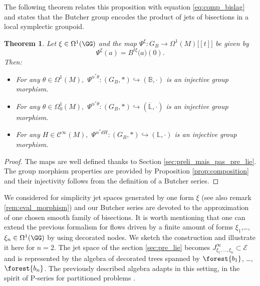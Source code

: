 \documentclass[a4paper,11pt]{article}
\newcommand{\func}[1]{\mathcal{C}^{\infty}(#1)}
\newtheorem{theorem}{Theorem}[section]
\begin{document}
The following theorem relates this proposition with equation \eqref{eq:comp_bislag} and states that the Butcher group encodes the product of jets of bisections in a local symplectic groupoid.
\begin{theorem}\label{thm:somewhat}
Let $\xi \in \Omega^1(\GG)$ and the map $\Psi^\xi \colon G_B \rightarrow \Omega^1(M)\bigl[ [ t ] \bigr]$ be given by
\[
\Psi^\xi(a)=B^{t\xi}\bigl(a\bigr)(0).
\]
Then:
\begin{itemize}
\item For any $\theta \in \Omega^1(M),$ $\Psi^{\alpha^*\theta} \colon (G_B,*) \hookrightarrow (\mathbb{B}, \cdot)$ is an injective group morphism.
\item For any $\theta \in \Omega_0^1(M),$ $\Psi^{\alpha^*\theta}\colon (G_B,*) \hookrightarrow (\overline{\mathbb{L}}, \cdot)$ is an injective group morphism.
\item For any $H \in \func{M},$ $\Psi^{\alpha^*dH}\colon (G_B,*) \hookrightarrow (\mathbb{L}, \cdot)$ is an injective group morphism.
\end{itemize}
\end{theorem}

\begin{proof}
The maps are well defined thanks to Section \ref{sec:preli_mais_pas_pre_lie}. The group morphism properties are provided by Proposition \ref{prop:composition} and their injectivity follows from the definition of a Butcher series. 
\end{proof}

We considered for simplicity jet spaces generated by one form $\xi$ (see also remark \ref{rem:eval_morphism}) and our Butcher series are devoted to the approximation of one chosen smooth family of bisections. It is worth mentioning that one can extend the previous formalism for flows driven by a finite amount of forms $\xi_1$,\dots, $\xi_n \in \Omega^1(\GG)$ by using decorated nodes. We sketch the construction and illustrate it here for $n=2$.
The jet space of the section \ref{sec:pre_lie} becomes $J^\infty_{\xi_1,\dots,\xi_n} \subset \mathcal{E}$ and is represented by the algebra of decorated trees spanned by $\forest{b_1}$, \dots, $\forest{b_n}$. The previously described algebra adapts in this setting, in the spirit of P-series for partitioned problems \cite{Hairer06gni}.
\end{document}
